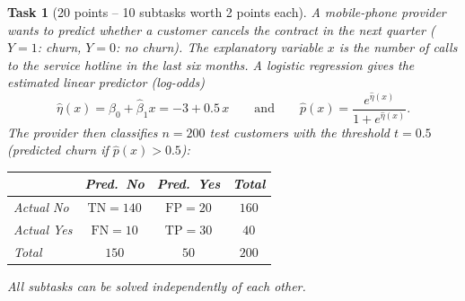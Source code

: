 \documentclass[a4paper]{article}
\theoremstyle{break}
\newtheorem{task}{Task}
\begin{document}
\begin{task} [20 points -- 10 subtasks worth 2 points each]
A mobile-phone provider wants to predict whether a customer cancels the contract
in the next quarter ($Y = 1$: churn, $Y = 0$: no churn). The explanatory variable $x$ is the
number of calls to the service hotline in the last six months. A logistic regression gives
the estimated linear predictor (log-odds)
\[ \hat\eta(x) = \hat\beta_0 + \hat\beta_1 x = -3 + 0.5\,x
   \qquad\text{and}\qquad \hat p(x) = \frac{e^{\hat\eta(x)}}{1+e^{\hat\eta(x)}} . \]
The provider then classifies $n = 200$ test customers with the threshold $t = 0.5$
(predicted churn if $\hat p(x) > 0.5$):

\medskip
\begin{center}
\renewcommand{\arraystretch}{1.3}
\begin{tabular}{l|cc|c}
& Pred.\ No & Pred.\ Yes & Total\\
\hline
Actual No & $\mathrm{TN} = 140$ & $\mathrm{FP} = 20$ & $160$\\
Actual Yes & $\mathrm{FN} = 10$ & $\mathrm{TP} = 30$ & $40$\\
\hline
Total & $150$ & $50$ & $200$\\
\end{tabular}
\end{center}

\medskip
\noindent\textit{All subtasks can be solved independently of each other.}


\end{task}
\end{document}

